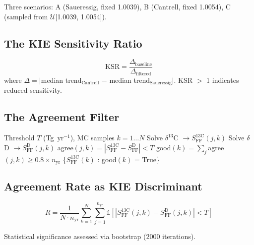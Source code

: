 \documentclass[11pt,twocolumn]{article}
\begin{document}
Three scenarios: A (Saueressig, fixed 1.0039), B (Cantrell, fixed 1.0054), C (sampled from $\mathcal{U}$[1.0039, 1.0054]).

\subsection{The KIE Sensitivity Ratio}

\begin{equation}
\mathrm{KSR} = \frac{\Delta_{\mathrm{baseline}}}{\Delta_{\mathrm{filtered}}}
\label{eq:ksr}
\end{equation}
where $\Delta = |$median trend$_{\mathrm{Cantrell}}$ $-$ median trend$_{\mathrm{Saueressig}}|$. KSR $>$ 1 indicates reduced sensitivity.

\subsection{The Agreement Filter}

\begin{algorithm}[h]
\caption{Dual-Isotope Agreement Filter}
\label{alg:filter}
\begin{algorithmic}[1]
\REQUIRE Threshold $T$ (Tg~yr$^{-1}$), MC samples $k = 1\ldots N$
  \STATE Solve $\delta^{13}$C $\rightarrow S_{\mathrm{FF}}^{13\mathrm{C}}(j,k)$
  \STATE Solve $\delta$D $\rightarrow S_{\mathrm{FF}}^{\mathrm{D}}(j,k)$
    \STATE agree$(j,k) = |S_{\mathrm{FF}}^{13\mathrm{C}} - S_{\mathrm{FF}}^{\mathrm{D}}| < T$
  \ENDFOR
  \STATE good$(k) = \sum_j$agree$(j,k) \geq 0.8 \times n_{\mathrm{yr}}$
\ENDFOR
\RETURN \{$S_{\mathrm{FF}}^{13\mathrm{C}}(k)$ : good$(k)$ = True\}
\end{algorithmic}
\end{algorithm}

\subsection{Agreement Rate as KIE Discriminant}

\begin{equation}
R = \frac{1}{N \cdot n_{\mathrm{yr}}} \sum_{k=1}^{N} \sum_{j=1}^{n_{\mathrm{yr}}} \mathbb{1}\left[|S_{\mathrm{FF}}^{13\mathrm{C}}(j,k) - S_{\mathrm{FF}}^{\mathrm{D}}(j,k)| < T\right]
\end{equation}

Statistical significance assessed via bootstrap (2000 iterations).

\end{document}
